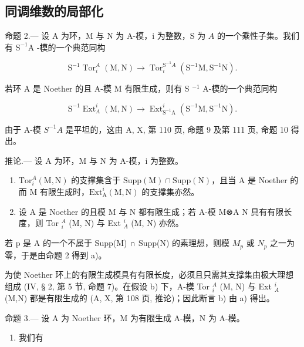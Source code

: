 \subsection{同调维数的局部化}

命题 2.--- 设 A 为环，M 与 N 为 A-模，i 为整数，S 为 \(A\) 的一个乘性子集。我们有 \(\mathrm{S}^{-1}\mathrm{A}\) -模的一个典范同构

\[
\mathrm{S} ^ {- 1} \operatorname{Tor} _ {i} ^ {A} (\mathrm{M}, \mathrm{N}) \longrightarrow \operatorname{Tor} _ {i} ^ {\mathrm{S} ^ {- 1} A} (\mathrm{S} ^ {- 1} \mathrm{M}, \mathrm{S} ^ {- 1} \mathrm{N}).
\]

若环 A 是 Noether 的且 A-模 M 有限生成，则有 S \(^{-1}\) A-模的一个典范同构

\[
\mathrm{S} ^ {- 1} \operatorname{Ext} _ {A} ^ {i} (\mathrm{M}, \mathrm{N}) \longrightarrow \operatorname{Ext} _ {\mathrm{S} ^ {- 1} \mathrm{A}} ^ {i} (\mathrm{S} ^ {- 1} \mathrm{M}, \mathrm{S} ^ {- 1} \mathrm{N}).
\]

由于 A-模 \(S^{-1}A\) 是平坦的，这由 A, X, 第 110 页, 命题 9 及第 111 页, 命题 10 得出。

推论.--- 设 A 为环，M 与 N 为 A-模，i 为整数。

\begin{enumerate}
\def\labelenumi{\alph{enumi})}
\item
  \(\mathrm{Tor}_{i}^{A}(\mathrm{M},\mathrm{N})\) 的支撑集含于 \(\mathrm{Supp}(\mathrm{M})\cap \mathrm{Supp}(\mathrm{N})\)，且当 A 是 Noether 的而 M 有限生成时，\(\mathrm{Ext}_{\mathrm{A}}^{i}(\mathrm{M},\mathrm{N})\) 的支撑集亦然。
\item
  设 A 是 Noether 的且模 M 与 N 都有限生成；若 A-模 M⊗A N 具有有限长度，则 Tor \(_{i}^{A}\) (M, N) 与 Ext \(_{A}^{i}\) (M, N) 亦然。
\end{enumerate}

若 p 是 A 的一个不属于 Supp(M) ∩ Supp(N) 的素理想，则模 \(M_{p}\) 或 \(N_{p}\) 之一为零，于是由命题 2 得到 a)。

为使 Noether 环上的有限生成模具有有限长度，必须且只需其支撑集由极大理想组成 (IV, § 2, 第 5 节, 命题 7)。在假设 b) 下，A-模 Tor \(_{i}^{A}\) (M, N) 与 Ext \(_{A}^{i}\) (M,N) 都是有限生成的 (A, X, 第 108 页, 推论)；因此断言 b) 由 a) 得出。

命题 3.--- 设 A 为 Noether 环，M 为有限生成 A-模，N 为 A-模。

\begin{enumerate}
\def\labelenumi{\alph{enumi})}
\tightlist
\item
  我们有
\end{enumerate}

